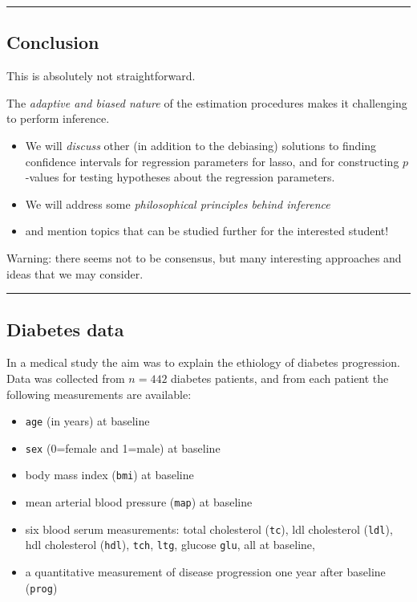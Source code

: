 \documentclass[
  letterpaper,
  DIV=11,
  numbers=noendperiod]{scrartcl}
\providecommand{\tightlist}{%
  \setlength{\itemsep}{0pt}\setlength{\parskip}{0pt}}\usepackage{longtable,booktabs,array}
\begin{document}
\begin{center}\rule{0.5\linewidth}{0.5pt}\end{center}

\hypertarget{conclusion}{%
\subsection{Conclusion}\label{conclusion}}

This is absolutely not straightforward.

The \emph{adaptive and biased nature} of the estimation procedures makes
it challenging to perform inference.

\begin{itemize}
\tightlist
\item
  We will \emph{discuss} other (in addition to the debiasing) solutions
  to finding confidence intervals for regression parameters for lasso,
  and for constructing \(p\)-values for testing hypotheses about the
  regression parameters.
\item
  We will address some \emph{philosophical principles behind inference}
\item
  and mention topics that can be studied further for the interested
  student!
\end{itemize}

Warning: there seems not to be consensus, but many interesting
approaches and ideas that we may consider.

\begin{center}\rule{0.5\linewidth}{0.5pt}\end{center}

\hypertarget{diabetes-data}{%
\subsection{Diabetes data}\label{diabetes-data}}

In a medical study the aim was to explain the ethiology of diabetes
progression. Data was collected from \(n=442\) diabetes patients, and
from each patient the following measurements are available:

\begin{itemize}
\tightlist
\item
  \texttt{age} (in years) at baseline
\item
  \texttt{sex} (0=female and 1=male) at baseline
\item
  body mass index (\texttt{bmi}) at baseline
\item
  mean arterial blood pressure (\texttt{map}) at baseline
\item
  six blood serum measurements: total cholesterol (\texttt{tc}), ldl
  cholesterol (\texttt{ldl}), hdl cholesterol (\texttt{hdl}),
  \texttt{tch}, \texttt{ltg}, glucose \texttt{glu}, all at baseline,
\item
  a quantitative measurement of disease progression one year after
  baseline (\texttt{prog})
\end{itemize}
\end{document}
